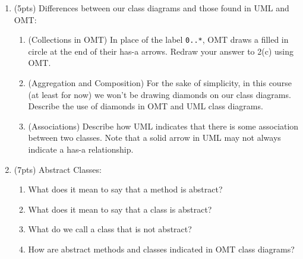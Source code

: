 \documentclass[11pt]{article}
\begin{document}
\begin{enumerate}
\begin{enumerate}
      \vfill
      \vfill
      \vfill
      \vfill

    \end{enumerate}

\newpage

  \item (5pts) Differences between our class diagrams and those found in UML and OMT:

  \begin{enumerate}

    \item (Collections in OMT) In place of the label \texttt{0..*}, OMT draws a filled in circle at the end of their has-a arrows. Redraw your answer to 2(c) using OMT.

    \vfill

    \item (Aggregation and Composition) For the sake of simplicity, in this course (at least for now) we won't be drawing diamonds on our class diagrams. Describe the use of diamonds in OMT and UML class diagrams. 

    \vfill
    \vfill

    \item (Associations) Describe how UML indicates that there is some association between two classes. Note that a solid arrow in UML may not always indicate a has-a relationship.

    \vfill
    \vfill

  \end{enumerate}

\newpage

  \item (7pts) Abstract Classes:

  \begin{enumerate}

    \item What does it mean to say that a method is abstract? 

    \vfill

    \item What does it mean to say that a class is abstract?

    \vfill

    \item What do we call a class that is not abstract?

    \vfill

    \item How are abstract methods and classes indicated in OMT class diagrams?


\end{enumerate}
\end{enumerate}
\end{document}
